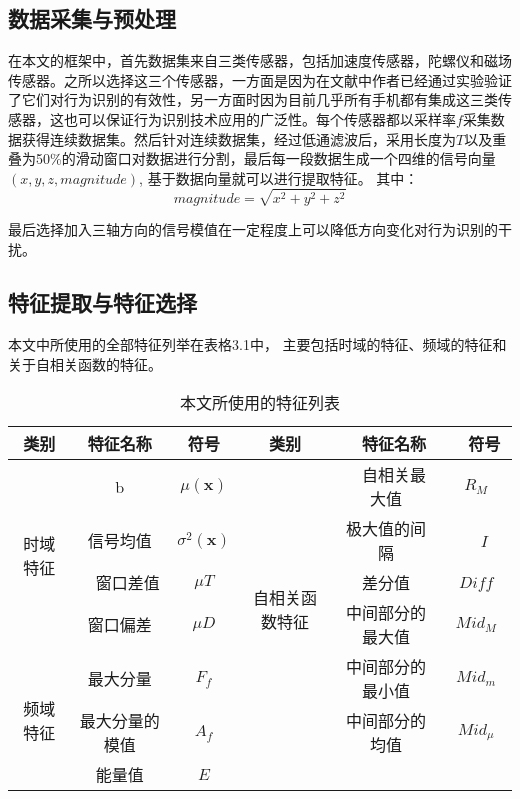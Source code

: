 \subsection{数据采集与预处理}
\par 在本文的框架中，首先数据集来自三类传感器，包括加速度传感器，陀螺仪和磁场传感器。之所以选择这三个传感器，一方面是因为在文献中\cite{diffSensors}作者已经通过实验验证了它们对行为识别的有效性，另一方面时因为目前几乎所有手机都有集成这三类传感器，这也可以保证行为识别技术应用的广泛性。每个传感器都以采样率$f$采集数据获得连续数据集。然后针对连续数据集，经过低通滤波后，采用长度为$T$以及重叠为50\%的滑动窗口对数据进行分割，最后每一段数据生成一个四维的信号向量$(x, y, z, magnitude)$, 基于数据向量就可以进行提取特征。 其中：
\begin{equation}
	magnitude = \sqrt{x^2+y^2+z^2}
\end{equation}
\par 最后选择加入三轴方向的信号模值在一定程度上可以降低方向变化对行为识别的干扰。

\subsection{特征提取与特征选择}
本文中所使用的全部特征列举在表格3.1中， 主要包括时域的特征、频域的特征和关于自相关函数的特征。

\begin{table}[!hbp]
    \caption{本文所使用的特征列表} %
    \begin{tabular}{|c|c|c|c|c|c|}
    \hline
    类别 & 特征名称 & 符号 & 类别 &　特征名称　&　符号　\\
    \hline
    \multirow{4}{*}{时域特征} & b　& $\mu (\textbf{x})$ & \multirow{6}{*}{自相关函数特征}　&　自相关最大值 & $R_M$ \\
    \cline{2-3} \cline{5-6}
    & 信号均值　& $\sigma ^2 (\textbf{x})$ & & 极大值的间隔　&　$I$  \\
    \cline{2-3} \cline{5-6}
    &　窗口差值 & $\mu T$ & & 差分值 & $Diff$ \\
    \cline{2-3} \cline{5-6}
    & 窗口偏差 & $\mu D$ & & 中间部分的最大值 & $Mid_M$ \\
    \cline{1-3} \cline{5-6}
    \multirow{3}{*}{频域特征} & 最大分量 & $F_f$ & & 中间部分的最小值 & $Mid_m$ \\
    \cline{2-3} \cline{5-6}
    & 最大分量的模值 & $A_f$ & & 中间部分的均值 & $Mid_{\mu}$ \\
    \cline{2-6}
    & 能量值 & $E$ & & & \\
    \hline
    \end{tabular}
\end{table}



